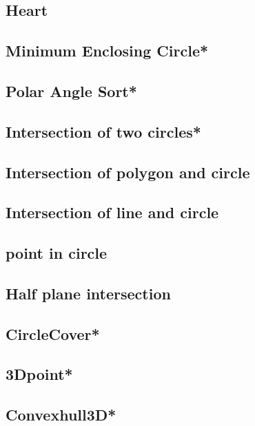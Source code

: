 \subsection{Heart}

\subsection{Minimum Enclosing Circle*} %

\subsection{Polar Angle Sort*} %

\subsection{Intersection of two circles*} %

\subsection{Intersection of polygon and circle}

\subsection{Intersection of line and circle}

\subsection{point in circle}

\subsection{Half plane intersection}

\subsection{CircleCover*} %

\subsection{3Dpoint*} %

\subsection{Convexhull3D*} %

